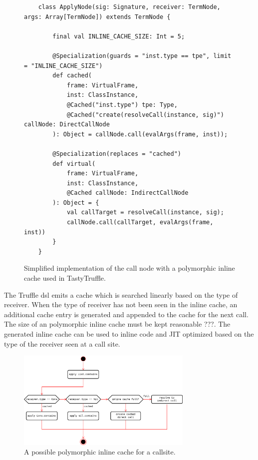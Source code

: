 \begin{figure}[H]
	\begin{verbatim}
	class ApplyNode(sig: Signature, receiver: TermNode, args: Array[TermNode]) extends TermNode {
		
		final val INLINE_CACHE_SIZE: Int = 5;
		
		@Specialization(guards = "inst.type == tpe", limit = "INLINE_CACHE_SIZE")
		def cached(
			frame: VirtualFrame,
			inst: ClassInstance,
			@Cached("inst.type") tpe: Type,
			@Cached("create(resolveCall(instance, sig)") callNode: DirectCallNode
		): Object = callNode.call(evalArgs(frame, inst));
		
		@Specialization(replaces = "cached")
		def virtual(
			frame: VirtualFrame,
			inst: ClassInstance,
			@Cached callNode: IndirectCallNode
		): Object = {
			val callTarget = resolveCall(instance, sig);
			callNode.call(callTarget, evalArgs(frame, inst))
		}
	}
	\end{verbatim}
	\caption{Simplified implementation of the call node with a polymorphic inline cache used in TastyTruffle.}
	\label{implementation:poly-cache-call-node}
\end{figure}

The Truffle \acrshort{dsl} emits a cache which is searched linearly based on the type of receiver. 
When the type of receiver has not been seen in the inline cache, an additional cache entry is generated and appended to the cache for the next call. 
The size of an polymorphic inline cache must be kept reasonable ???. 
The generated inline cache can be used to inline code and JIT optimized based on the type of the receiver seen at a call site. 


\begin{figure}[H]
	\centering
	\includegraphics[width=0.75\textwidth]{figures/tastytruffle-pic-example.png}
	\caption{A possible polymorphic inline cache for a  callsite.}
	\label{example:poly-cache-call-node}
\end{figure}

